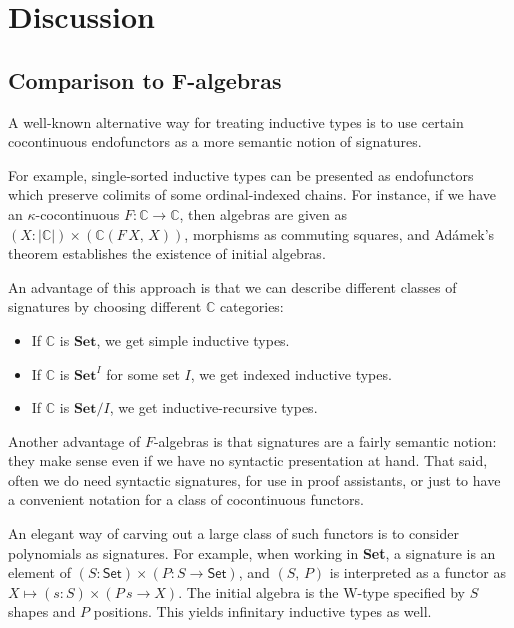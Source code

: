 \documentclass[12pt,a4paper,twoside,openany]{book}
\theoremstyle{remark}
\theoremstyle{definition}
\newcommand{\mbb}[1]{\mathbb{#1}}
\newcommand{\mbf}[1]{\mathbf{#1}}
\newcommand{\Set}{\mathsf{Set}}
\begin{document}
\section{Discussion}

\subsection{Comparison to F-algebras}

A well-known alternative way for treating inductive types is to use certain
cocontinuous endofunctors as a more semantic notion of signatures.

For example, single-sorted inductive types can be presented as endofunctors
which preserve colimits of some ordinal-indexed chains. For instance, if we have
an $\kappa$-cocontinuous $F : \mbb{C} \to \mbb{C}$, then algebras are given as
$(X : |\mbb{C}|) \times (\mbb{C}(F\,X,\,X))$, morphisms as commuting squares,
and Adámek's theorem \cite{adamek} establishes the existence of initial
algebras.

An advantage of this approach is that we can describe different classes of
signatures by choosing different $\mbb{C}$ categories:
\begin{itemize}
  \item If $\mbb{C}$ is $\mbf{Set}$, we get simple inductive types.
  \item If $\mbb{C}$ is $\mbf{Set}^I$ for some set $I$, we get indexed inductive types.
  \item If $\mbb{C}$ is $\mbf{Set}/I$, we get inductive-recursive types.
\end{itemize}

Another advantage of $F$-algebras is that signatures are a fairly semantic
notion: they make sense even if we have no syntactic presentation at hand. That
said, often we do need syntactic signatures, for use in proof assistants, or
just to have a convenient notation for a class of cocontinuous functors.

An elegant way of carving out a large class of such functors is to
consider polynomials as signatures. For example, when working in \textbf{Set}, a
signature is an element of $(S : \Set) \times (P : S \to \Set)$, and $(S,\,P)$
is interpreted as a functor as $X \mapsto (s : S) \times (P\,s \to X)$. The
initial algebra is the W-type specified by $S$ shapes and $P$ positions. This
yields infinitary inductive types as well.
\end{document}
